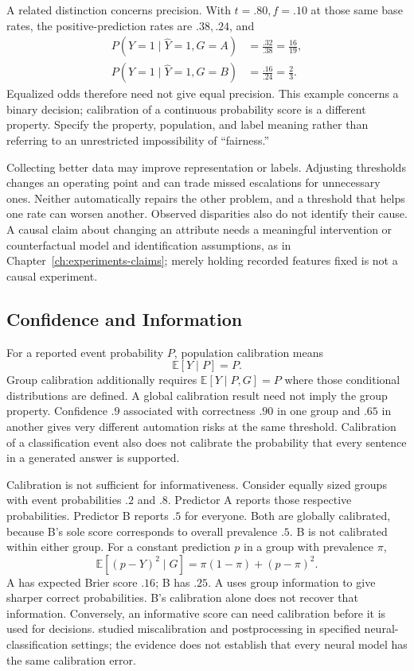 A related distinction concerns precision. With $t=.80,f=.10$ at those same base rates, the positive-prediction rates are $.38,.24$, and
\[
\begin{aligned}
P(Y=1\mid\hat Y=1,G=A)&=\frac{.32}{.38}=\frac{16}{19},\\
P(Y=1\mid\hat Y=1,G=B)&=\frac{.16}{.24}=\frac23.
\end{aligned}
\]
Equalized odds therefore need not give equal precision. This example concerns a binary decision; calibration of a continuous probability score is a different property. Specify the property, population, and label meaning rather than referring to an unrestricted impossibility of ``fairness.''

Collecting better data may improve representation or labels. Adjusting thresholds changes an operating point and can trade missed escalations for unnecessary ones. Neither automatically repairs the other problem, and a threshold that helps one rate can worsen another. Observed disparities also do not identify their cause. A causal claim about changing an attribute needs a meaningful intervention or counterfactual model and identification assumptions, as in Chapter~\ref{ch:experiments-claims}; merely holding recorded features fixed is not a causal experiment.

\subsection{Confidence and Information}

For a reported event probability $P$, population calibration means
\[
\mathbb E[Y\mid P]=P.
\]
Group calibration additionally requires $\mathbb E[Y\mid P,G]=P$ where those conditional distributions are defined. A global calibration result need not imply the group property. Confidence $.9$ associated with correctness $.90$ in one group and $.65$ in another gives very different automation risks at the same threshold. Calibration of a classification event also does not calibrate the probability that every sentence in a generated answer is supported.

Calibration is not sufficient for informativeness. Consider equally sized groups with event probabilities $.2$ and $.8$. Predictor A reports those respective probabilities. Predictor B reports $.5$ for everyone. Both are globally calibrated, because B's sole score corresponds to overall prevalence $.5$. B is not calibrated within either group. For a constant prediction $p$ in a group with prevalence $\pi$,
\[
\mathbb E[(p-Y)^2\mid G]
=\pi(1-\pi)+(p-\pi)^2.
\]
A has expected Brier score $.16$; B has $.25$. A uses group information to give sharper correct probabilities. B's calibration alone does not recover that information. Conversely, an informative score can need calibration before it is used for decisions. \citet{guo2017} studied miscalibration and postprocessing in specified neural-classification settings; the evidence does not establish that every neural model has the same calibration error.

